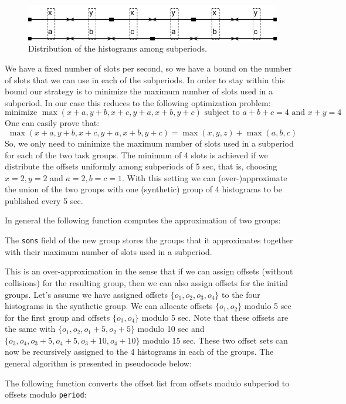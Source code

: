 \begin{figure}[ht!]
\centering
\includegraphics[scale=0.6]{Images/subperiod.png}
\caption{Distribution of the histograms among subperiods.}
\label{fig:subperiod}
\end{figure}

We have a fixed number of slots per second, so we have a bound on the number of slots that we can use in each of the subperiods. In order to stay within this bound our strategy is to minimize the maximum number of slots used in a subperiod. In our case this reduces to the following optimization problem:
$$ \text{minimize } \max(x+a, y+b, x+c, y+a, x+b, y+c) \text{ subject to } a+b+c=4 \text{ and } x+y = 4 $$
One can easily prove that:
$$ \max(x+a, y+b, x+c, y+a, x+b, y+c) = \max(x, y, z) + \max(a, b, c)$$
So, we only need to minimize the maximum number of slots used in a subperiod for each of the two task groups. The minimum of 4 slots is achieved if we distribute the offsets uniformly among subperiods of 5 sec, that is, choosing $x=2, y=2$ and $a=2, b=c=1$. With this setting we can (over-)approximate the union of the two groups with one (synthetic) group of 4 histograms to be published every 5 sec.

In general the following function computes the approximation of two groups:

The \verb+sons+ field of the new group stores the groups that it approximates together with their maximum number of slots used in a subperiod.

This is an over-approximation in the sense that if we can assign offsets (without collisions) for the resulting group, then we can also assign offsets for the initial groups. Let's assume we have assigned offsets $\{o_1,o_2,o_3,o_4\}$ to the four histograms in the synthetic group. We can allocate offsets $\{o_1, o_2\}$ modulo 5 sec for the first group and offsets $\{o_3, o_4\}$ modulo 5 sec. Note that these offsets are the same with $\{o_1, o_2, o_1 + 5, o_2 + 5\}$ modulo 10 sec and $\{o_3, o_4, o_3 + 5, o_4 + 5, o_3 + 10, o_4 + 10\}$ modulo 15 sec. These two offset sets can now be recursively assigned to the 4 histograms in each of the groups. The general algorithm is presented in pseudocode below:

The following function converts the offset list from offsets modulo subperiod to offsets modulo \verb+period+:


